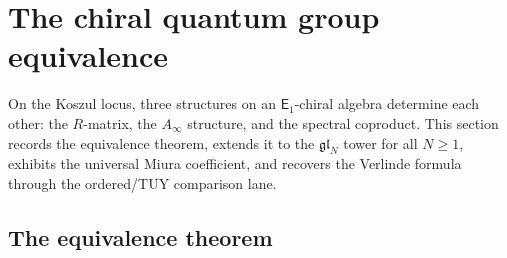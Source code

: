 \documentclass[11pt,reqno]{amsart}
\theoremstyle{definition}
\theoremstyle{remark}
\newcommand{\Ainf}{A_{\infty}}
\newcommand{\Eone}{\mathsf{E}_{1}}
\numberwithin{equation}{section}
\begin{document}
\section{The chiral quantum group equivalence}
\label{sec:chiral-qg}

On the Koszul locus, three structures on an $\Eone$-chiral algebra
determine each other: the $R$-matrix, the $\Ainf$ structure, and the
spectral coproduct. This section records the equivalence theorem,
extends it to the $\mathfrak{gl}_N$ tower for all $N \geq 1$,
exhibits the universal Miura coefficient, and recovers the
Verlinde formula through the ordered/TUY comparison lane.

\subsection{The equivalence theorem}
\end{document}
